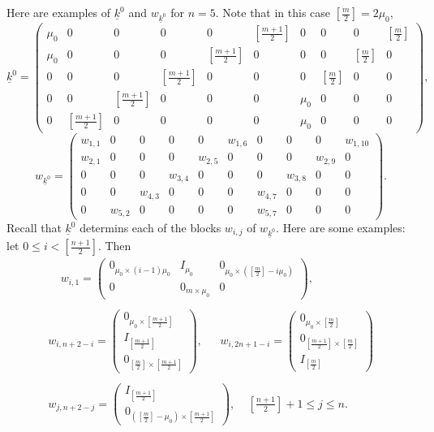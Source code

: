 \documentclass[12pts]{amsart}
\newcommand{\I}{{\mathrm{I}}}
\begin{document}
Here are examples of $\underline{k}^0$ and $w_{\underline{k}^0}$ for $n=5$. Note that in this case $[\frac{m}{2}]=2\mu_0$,
$$
\underline{k}^0=\begin{pmatrix}\mu_0&0&0&0&0&[\frac{m+1}{2}]&0&0&0&[\frac{m}{2}]\\\mu_0&0&0&0&[\frac{m+1}{2}]&0&0&0&[\frac{m}{2}]&0\\0&0&0&[\frac{m+1}{2}]&0&0&0&[\frac{m}{2}]&0&0\\0&0&[\frac{m+1}{2}]&0&0&0&\mu_0&0&0&0\\0&[\frac{m+1}{2}]&0&0&0&0&\mu_0&0&0&0\end{pmatrix},
$$
$$
w_{\underline{k}^0}=\begin{pmatrix}w_{1,1}&0&0&0&0&w_{1,6}&0&0&0&w_{1,10}\\w_{2,1}&0&0&0&w_{2,5}&0&0&0&w_{2,9}&0\\0&0&0&w_{3,4}&0&0&0&w_{3,8}&0&0\\0&0&w_{4,3}&0&0&0&w_{4,7}&0&0&0\\0&w_{5,2}&0&0&0&0&w_{5,7}&0&0&0\end{pmatrix}.
$$
Recall that $\underline{k}^0$ determins each of the blocks $w_{i,j}$ of $w_{\underline{k}^0}$. Here are some examples: let $0\leq i< [\frac{n+1}{2}]$. Then
\begin{multline}\label{13.11}
\ \ \ \ \ w_{i,1}=\begin{pmatrix}0_{\mu_0\times (i-1)\mu_0}&I_{\mu_0}&0_{\mu_0\times  ([\frac{m}{2}]-i\mu_0)}\\0&0_{m\times \mu_0}&0\end{pmatrix},\\
\\
w_{i,n+2-i}=\begin{pmatrix}0_{\mu_0\times [\frac{m+1}{2}]}\\I_{[\frac{m+1}{2}]}\\0_{[\frac{m}{2}]\times [\frac{m+1}{2}]}\end{pmatrix},\ \ \ \ \ \ \ w_{i,2n+1-i}=\begin{pmatrix}0_{\mu_0\times [\frac{m}{2}]}\\0_{[\frac{m+1}{2}]\times [\frac{m}{2}]}\\I_{[\frac{m}{2}]}\end{pmatrix}\\
\\
w_{j,n+2-j}=\begin{pmatrix}I_{[\frac{m+1}{2}]}\\0_{([\frac{m}{2}]-\mu_0)\times [\frac{m+1}{2}]}\end{pmatrix},\ \ \ \ \ [\frac{n+1}{2}]+1\leq j\leq n .
\end{multline}
\end{document}
